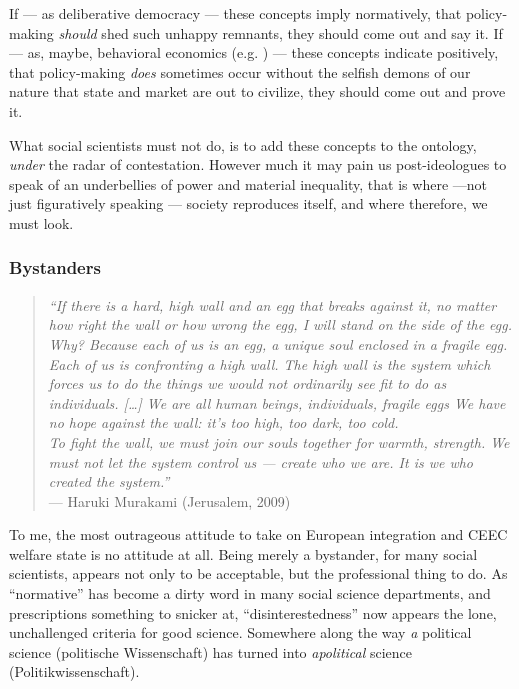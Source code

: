 \documentclass[11pt,a4paper,oneside,openright]{article}
\begin{document}
If --- as deliberative democracy \citep[e.g.][]{Elster-1998-aa} --- these concepts imply normatively, that policy-making \emph{should} shed such unhappy remnants, they should come out and say it. 
If --- as, maybe, behavioral economics (e.g. \citealt{Tomasello2009}) --- these concepts indicate positively, that policy-making \emph{does} sometimes occur without the selfish demons of our nature that state and market are out to civilize, they should come out and prove it. 

What social scientists must not do, is to add these concepts to the ontology, \emph{under} the radar of contestation. 
However much it may pain us post-ideologues to speak of \citeauthor{Agnoli-1989-aa}an underbellies of power and material inequality, that is where ---not just figuratively speaking --- society reproduces itself, and where therefore, we must look.

\subsubsection{Bystanders}

\begin{quote}
	\emph{``If there is a hard, high wall and an egg that breaks against it, no matter how right the wall or how wrong the egg, I will stand on the side of the egg. \\
	Why? 
	Because each of us is an egg, a unique soul enclosed in a fragile egg. 
	Each of us is confronting a high wall. 
	The high wall is the system which forces us to do the things we would not ordinarily see fit to do as individuals. 
	[\ldots] 
	We are all human beings, individuals, fragile eggs
	We have no hope against the wall: 
	it's too high, too dark, too cold. \\
	To fight the wall, we must join our souls together for warmth, strength. 
	We must not let the system control us --- create who we are. It is we who created the system.''}\\
	--- Haruki Murakami (Jerusalem, 2009)
\end{quote}

To me, the most outrageous attitude to take on European integration and \gls{CEEC} welfare state is no attitude at all. 
Being merely a bystander, for many social scientists, appears not only to be acceptable, but the professional thing to do. 
As ``normative'' has become a dirty word in many social science departments, and prescriptions something to snicker at, ``disinterestedness'' now appears the lone, unchallenged criteria for good science. 
Somewhere along the way \emph{a} political science (politische Wissenschaft) has turned into \emph{apolitical} science (Politikwissenschaft).
\end{document}
